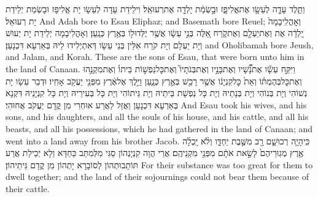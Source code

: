 {וַתֵּ֧לֶד עָדָ֛ה לְעֵשָׂ֖ו אֶת\maqqaf אֱלִיפָ֑ז וּבָ֣שְׂמַ֔ת יָלְדָ֖ה אֶת\maqqaf רְעוּאֵֽל׃}
{וִילֵידַת עָדָה לְעֵשָׂו יָת אֱלִיפָז וּבָשְׂמַת יְלֵידַת יָת רְעוּאֵל׃}
{And Adah bore to Esau Eliphaz; and Basemath bore Reuel;}{}
{וְאׇהֳלִֽיבָמָה֙ יָֽלְדָ֔ה אֶת\maqqaf {} וְאֶת\maqqaf יַעְלָ֖ם וְאֶת\maqqaf קֹ֑רַח אֵ֚לֶּה בְּנֵ֣י עֵשָׂ֔ו אֲשֶׁ֥ר יֻלְּדוּ\maqqaf ל֖וֹ בְּאֶ֥רֶץ כְּנָֽעַן׃}
{וְאָהֳלִיבָמָה יְלֵידַת יָת יְעוּשׁ וְיָת יַעְלָם וְיָת קֹרַח אִלֵּין בְּנֵי עֵשָׂו דְּאִתְיְלִידוּ לֵיהּ בְּאַרְעָא דִּכְנָעַן׃}
{and Oholibamah bore Jeush, and Jalam, and Korah. These are the sons of Esau, that were born unto him in the land of Canaan.}{}
{וַיִּקַּ֣ח עֵשָׂ֡ו אֶת\maqqaf נָ֠שָׁ֠יו וְאֶת\maqqaf בָּנָ֣יו וְאֶת\maqqaf בְּנֹתָיו֮ וְאֶת\maqqaf כׇּל\maqqaf נַפְשׁ֣וֹת בֵּיתוֹ֒ וְאֶת\maqqaf מִקְנֵ֣הוּ וְאֶת\maqqaf כׇּל\maqqaf בְּהֶמְתּ֗וֹ וְאֵת֙ כׇּל\maqqaf קִנְיָנ֔וֹ אֲשֶׁ֥ר רָכַ֖שׁ בְּאֶ֣רֶץ כְּנָ֑עַן וַיֵּ֣לֶךְ אֶל\maqqaf אֶ֔רֶץ מִפְּנֵ֖י יַעֲקֹ֥ב אָחִֽיו׃}
{וּדְבַר עֵשָׂו יָת נְשׁוֹהִי וְיָת בְּנוֹהִי וְיָת בְּנָתֵיהּ וְיָת כָּל נַפְשָׁת בֵּיתֵיהּ וְיָת גֵּיתוֹהִי וְיָת כָּל בְּעִירֵיהּ וְיָת כָּל קִנְיָנֵיהּ דִּקְנָא בְּאַרְעָא דִּכְנָעַן וַאֲזַל לַאֲרַע אוּחְרִי מִן קֳדָם יַעֲקֹב אֲחוּהִי׃}
{And Esau took his wives, and his sons, and his daughters, and all the souls of his house, and his cattle, and all his beasts, and all his possessions, which he had gathered in the land of Canaan; and went into a land away from his brother Jacob.}{}
{כִּֽי\maqqaf הָיָ֧ה רְכוּשָׁ֛ם רָ֖ב מִשֶּׁ֣בֶת יַחְדָּ֑ו וְלֹ֨א יָֽכְלָ֜ה אֶ֤רֶץ מְגֽוּרֵיהֶם֙ לָשֵׂ֣את אֹתָ֔ם מִפְּנֵ֖י מִקְנֵיהֶֽם׃}
{אֲרֵי הֲוָה קִנְיָנְהוֹן סַגִּי מִלְּמִתַּב כַּחְדָּא וְלָא יְכֵילַת אֲרַע תּוֹתָבוּתְהוֹן לְסוֹבָרָא יָתְהוֹן מִן קֳדָם גֵּיתֵיהוֹן׃}
{For their substance was too great for them to dwell together; and the land of their sojournings could not bear them because of their cattle.}{}

